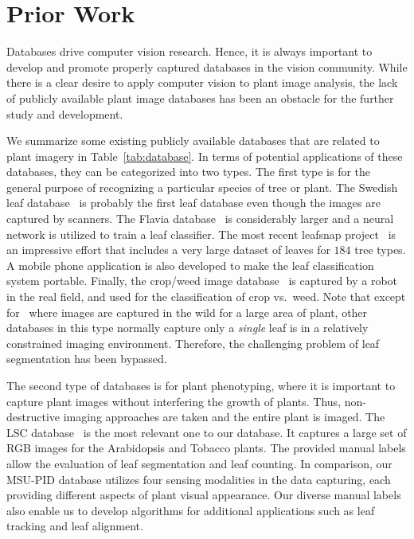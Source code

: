 \section{Prior Work}
\label{sec:prior}

Databases drive computer vision research.
Hence, it is always important to develop and promote properly captured databases in the vision community.
While there is a clear desire to apply computer vision to plant image analysis, the lack of publicly available plant image databases has been an obstacle for the further study and development.

We summarize some existing publicly available databases that are related to plant imagery in Table~\ref{tab:database}.
In terms of potential applications of these databases, they can be categorized into two types.
The first type is for the general purpose of recognizing a particular species of tree or plant.
The Swedish leaf database~\cite{soderkvist2001computer} is probably the first leaf database even though the images are captured by scanners.
The Flavia database~\cite{wu2007leaf} is considerably larger and a neural network is utilized to train a leaf classifier.
The most recent leafsnap project~\cite{kumar2012leafsnap} is an impressive effort that includes a very large dataset of leaves for $184$ tree types.
A mobile phone application is also developed to make the leaf classification system portable.
Finally, the crop/weed image database~\cite{haug2014crop} is captured by a robot in the real field, and used for the classification of crop vs.~weed.
Note that except for~\cite{haug2014crop} where images are captured in the wild for a large area of plant, other databases in this type normally capture only a {\it single} leaf is in a relatively constrained imaging environment.
Therefore, the challenging problem of leaf segmentation has been bypassed.

The second type of databases is for plant phenotyping, where it is important to capture plant images without interfering the growth of plants.
Thus, non-destructive imaging approaches are taken and the entire plant is imaged. The LSC database~\cite{scharr2014annotated} is the most relevant one to our database. It captures a large set of RGB images for the Arabidopsis and Tobacco plants. The provided manual labels allow the evaluation of leaf segmentation and leaf counting. In comparison, our MSU-PID database utilizes four sensing modalities in the data capturing, each providing different aspects of plant visual appearance.
Our diverse manual labels also enable us to develop algorithms for additional applications such as leaf tracking and leaf alignment.

